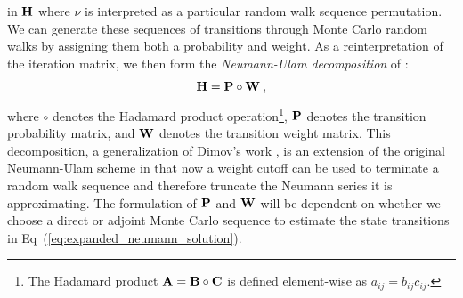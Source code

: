 in $\mathbf{H}$ where $\nu$ is interpreted as a particular random walk
sequence permutation. We can generate these sequences of transitions
through Monte Carlo random walks by assigning them both a probability
and weight. As a reinterpretation of the iteration matrix, we then
form the \textit{Neumann-Ulam decomposition} of :
\begin{equation}
  \mathbf{H} = \mathbf{P} \circ \mathbf{W}\:,
  \label{eq:neumann_ulam_decomposition}
\end{equation}
where $\circ$ denotes the Hadamard product operation\footnote{The
  Hadamard product $\mathbf{A} = \mathbf{B} \circ \mathbf{C}$ is defined
  element-wise as $a_{ij} = b_{ij} c_{ij}$.}, $\mathbf{P}$ denotes the
transition probability matrix, and $\mathbf{W}$ denotes the transition
weight matrix. This decomposition, a generalization of Dimov's work
\citep{dimov_new_1998}, is an extension of the original Neumann-Ulam
scheme in that now a weight cutoff can be used to terminate a random
walk sequence and therefore truncate the Neumann series it is
approximating. The formulation of $\mathbf{P}$ and $\mathbf{W}$ will be
dependent on whether we choose a direct or adjoint Monte Carlo
sequence to estimate the state transitions in
Eq~(\ref{eq:expanded_neumann_solution}).

